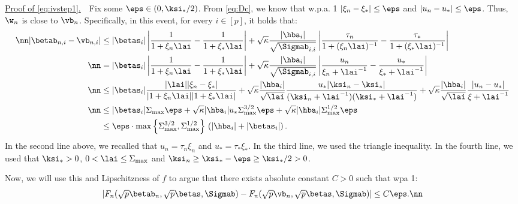 \vspace{2pt}
\noindent\underline{Proof of \eqref{eq:ivstep1}.}~~Fix some $\eps\in(0,\ksi_*/2)$. From \eqref{eq:Dc}, we know that w.p.a. 1 $|\xi_n-\xi_*|\leq \eps$ and $|u_n-u_*|\leq \eps$. Thus, $\w_n$ is close to $\vb_n$. Specifically, in this event, for every $i\in[p]$, it holds that:
\begin{align}
\nn|\betab_{n,i} - \vb_{n,i}| &\leq {|\betas_i|}\left|\frac{1}{1+\xi_n\lai}-\frac{1}{1+\xi_*\lai}\right| + \sqrt{\kappa}\frac{|\hba_i|}{\sqrt{\Sigmab_{i,i}}}\left|\frac{\tau_n}{1+(\xi_n\lai)^{-1}}-\frac{\tau_*}{1+(\xi_*\lai)^{-1}}\right| \\
\nn&= {|\betas_i|}\left|\frac{1}{1+\xi_n\lai}-\frac{1}{1+\xi_*\lai}\right| + \sqrt{\kappa}\frac{|\hba_i|}{\sqrt{\Sigmab_{i,i}}}\left|\frac{u_n}{\xi_n+\lai^{-1}}-\frac{u_*}{\xi_*+\lai^{-1}}\right| \\
\nn& \leq
{|\betas_i|}\frac{|\lai||\xi_n-\xi_*|}{|1+\xi_n\lai||1+\xi_*\lai|} + \sqrt{\kappa}\frac{|\hba_i|}{\sqrt{\lai}}  \frac{u_*|\ksi_n-\ksi_*|}{(\ksi_n+\lai^{-1})(\ksi_*+\lai^{-1})} + 
\sqrt{\kappa}\frac{|\hba_i|}{\sqrt{\lai}}\frac{|u_n-u_*|}{\xi+\lai^{-1}}
\\
\nn& \leq
{|\betas_i|}{\Sigma_{\max}\eps} + \sqrt{\kappa}{|\hba_i|} u_*\Sigma_{\max}^{3/2} \eps+ 
\sqrt{\kappa}|\hba_i|\Sigma_{\max}^{1/2}\eps
\\
&\leq \eps \cdot \max\left\{\Sigma_{\max}^{3/2},\Sigma_{\max}^{1/2}\right\}\, \left(|\hba_i| + |\betas_i|\right).\label{eq:betav}
\end{align}%
In the second line above, we recalled that $u_n=\tau_n\xi_n$ and $u_*=\tau_*\xi_*$. In the third line, we used the triangle inequality. In the fourth line, we used that $\ksi_*>0$, $0<\lai\leq\Sigma_{\max}$ and $\ksi_n\geq \ksi_*-\eps \geq \ksi_*/2 >0$. 

Now, we will use this and Lipschitzness of $f$ to argue that there exists absolute constant $C>0$ such that wpa 1:
\begin{align}
|F_n(\sqrt{p}\betab_n,\sqrt{p}\betas,\Sigmab) - F_n(\sqrt{p}\vb_n,\sqrt{p}\betas,\Sigmab) | \leq C\eps.\nn
\end{align}

